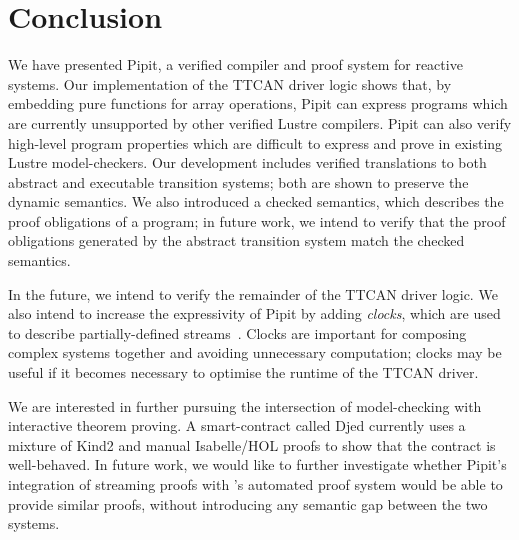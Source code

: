 
\section{Conclusion}

We have presented Pipit, a verified compiler and proof system for reactive systems.
Our implementation of the TTCAN driver logic shows that, by embedding pure \fstar{} functions for array operations, Pipit can express programs which are currently unsupported by other verified Lustre compilers.
Pipit can also verify high-level program properties which are difficult to express and prove in existing Lustre model-checkers.
Our development includes verified translations to both abstract and executable transition systems; both are shown to preserve the dynamic semantics.
We also introduced a checked semantics, which describes the proof obligations of a program; in future work, we intend to verify that the proof obligations generated by the abstract transition system match the checked semantics.

In the future, we intend to verify the remainder of the TTCAN driver logic.
We also intend to increase the expressivity of Pipit by adding \emph{clocks}, which are used to describe partially-defined streams~\cite{caspi1995functional}.
Clocks are important for composing complex systems together and avoiding unnecessary computation; clocks may be useful if it becomes necessary to optimise the runtime of the TTCAN driver.

We are interested in further pursuing the intersection of model-checking with interactive theorem proving.
A smart-contract called Djed \cite{zahnentferner2023djed} currently uses a mixture of Kind2 \cite{champion2016kind2} and manual Isabelle/HOL proofs to show that the contract is well-behaved.
In future work, we would like to further investigate whether Pipit's integration of streaming proofs with \fstar{}'s automated proof system would be able to provide similar proofs, without introducing any semantic gap between the two systems.
